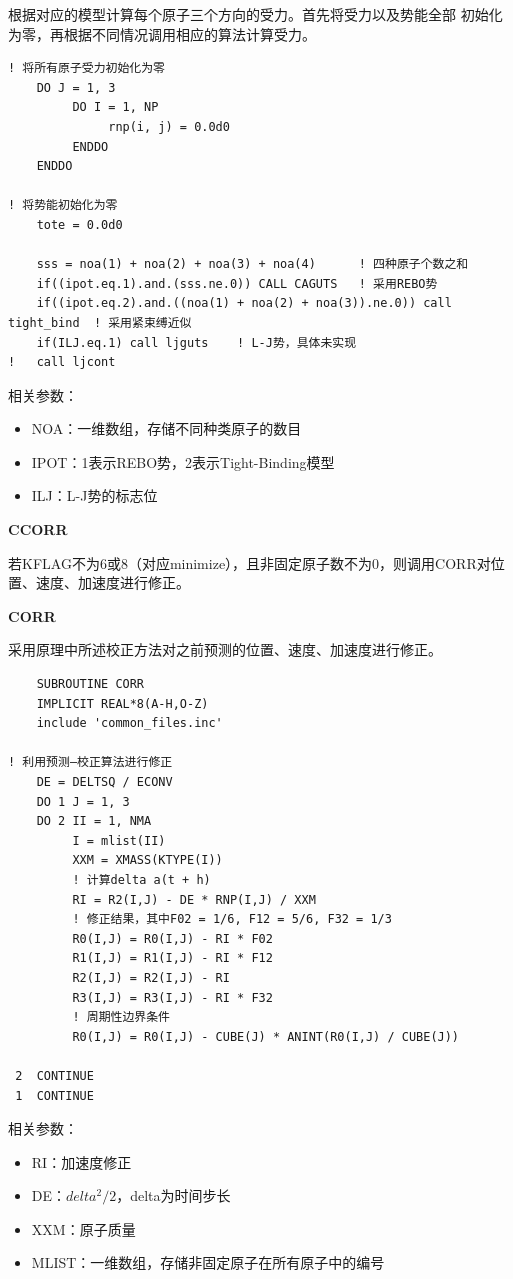 \documentclass{ctexart}
\begin{document}
根据对应的模型计算每个原子三个方向的受力。首先将受力以及势能全部
初始化为零，再根据不同情况调用相应的算法计算受力。

\begin{verbatim}
! 将所有原子受力初始化为零 
    DO J = 1, 3
         DO I = 1, NP
              rnp(i, j) = 0.0d0
         ENDDO
    ENDDO

! 将势能初始化为零
    tote = 0.0d0

    sss = noa(1) + noa(2) + noa(3) + noa(4)      ! 四种原子个数之和
    if((ipot.eq.1).and.(sss.ne.0)) CALL CAGUTS   ! 采用REBO势
    if((ipot.eq.2).and.((noa(1) + noa(2) + noa(3)).ne.0)) call tight_bind  ! 采用紧束缚近似
    if(ILJ.eq.1) call ljguts    ! L-J势，具体未实现
!   call ljcont
\end{verbatim}

\noindent
相关参数：
\begin{itemize}
    \item NOA：一维数组，存储不同种类原子的数目
    \item IPOT：1表示REBO势，2表示Tight-Binding模型
    \item ILJ：L-J势的标志位
\end{itemize}

\noindent
\textbf{CCORR}

若KFLAG不为6或8（对应minimize），且非固定原子数不为0，则调用CORR对位置、速度、加速度进行修正。

\noindent
\textbf{CORR}

采用原理中所述校正方法对之前预测的位置、速度、加速度进行修正。

\begin{verbatim}
    SUBROUTINE CORR
    IMPLICIT REAL*8(A-H,O-Z)
    include 'common_files.inc'

! 利用预测—校正算法进行修正
    DE = DELTSQ / ECONV
    DO 1 J = 1, 3
    DO 2 II = 1, NMA
         I = mlist(II)
         XXM = XMASS(KTYPE(I))
         ! 计算delta a(t + h)
         RI = R2(I,J) - DE * RNP(I,J) / XXM
         ! 修正结果，其中F02 = 1/6, F12 = 5/6, F32 = 1/3
         R0(I,J) = R0(I,J) - RI * F02
         R1(I,J) = R1(I,J) - RI * F12
         R2(I,J) = R2(I,J) - RI
         R3(I,J) = R3(I,J) - RI * F32
         ! 周期性边界条件
         R0(I,J) = R0(I,J) - CUBE(J) * ANINT(R0(I,J) / CUBE(J))

 2  CONTINUE
 1  CONTINUE
\end{verbatim}

\noindent
相关参数：
\begin{itemize}
    \item RI：加速度修正
    \item DE：$delta ^ 2 / 2$，delta为时间步长
    \item XXM：原子质量
    \item MLIST：一维数组，存储非固定原子在所有原子中的编号
\end{itemize}
\end{document}

